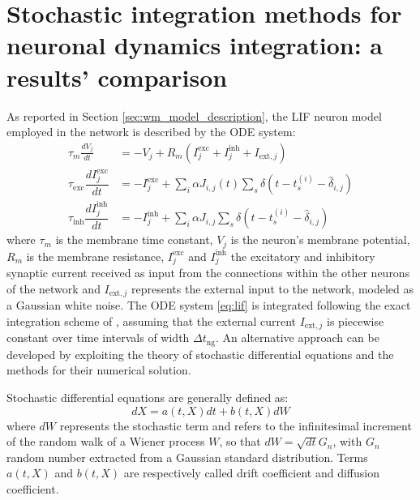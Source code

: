 \documentclass[a4paper, 12pt, twoside, openright]{book}
\begin{document}
\section{Stochastic integration methods for neuronal dynamics integration: a results' comparison}
As reported in Section \ref{sec:wm_model_description}, the LIF neuron model employed in the network is described by the ODE system:
\begin{equation}
\begin{split}
    \tau_m \frac{dV_j}{dt} &=-V_j + R_m ( I_{j}^{\text{exc}}+I_{j}^{\text{inh}} + I_{\text{ext},j}) \\
    \tau_{\text{exc}}\dfrac{d I_{j}^{\text{exc}}}{dt} &= - I_{j}^{\text{exc}} + \sum_i \alpha J_{i,j}(t) \sum_s \delta (t-t_s ^{(i)}-\hat{\delta}_{i,j}) \\
    \tau_{\text{inh}}\dfrac{d I_{j}^{\text{inh}}}{dt} &= - I_{j}^{\text{inh}} + \sum_i \alpha J_{i,j} \sum_s \delta (t-t_s ^{(i)}-\hat{\delta}_{i,j})
    \label{eq:lif}
\end{split}
\end{equation}
where $\tau_m$ is the membrane time constant, $V_j$ is the neuron's membrane potential, $R_m$ is the membrane resistance, $I_j^{\text{exc}}$ and $I_j^{\text{inh}}$ the excitatory and inhibitory synaptic current received as input from the connections within the other neurons of the network and $I_{\text{ext},j}$ represents the external input to the network, modeled as a Gaussian white noise. The ODE system \eqref{eq:lif} is integrated following the exact integration scheme of \cite{Rotter1999}, assuming that the external current $I_{\text{ext},j}$ is piecewise constant over time intervals of width $\Delta t_{\text{ng}}$. An alternative approach can be developed by exploiting the theory of stochastic differential equations and the methods for their numerical solution.

Stochastic differential equations are generally defined as:
\begin{equation}
    dX=a(t,X)dt + b(t,X) dW
    \label{eq:sde}
\end{equation}
where $dW$ represents the stochastic term and refers to the infinitesimal increment of the random walk of a Wiener process $W$, so that $dW = \sqrt{dt}G_n$, with $G_n$ random number extracted from a Gaussian standard distribution. Terms $a(t, X)$ and $b(t, X)$ are respectively called drift coefficient and diffusion coefficient.
\end{document}

